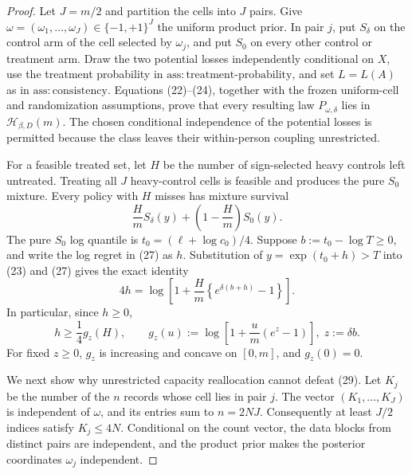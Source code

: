 \documentclass{article}
\begin{document}
\begin{proof}
Let \(J=m/2\) and partition the cells into \(J\) pairs.  Give
\(\omega=(\omega_1,\ldots,\omega_J)\in\{-1,+1\}^J\) the uniform product prior.  In pair \(j\), put \(S_\delta\) on the control arm of the cell selected by \(\omega_j\), and put \(S_0\) on every other control or treatment arm.  Draw the two potential losses independently conditional on \(X\), use the treatment probability in \(\mathrm{ass{:}treatment\text{-}probability}\), and set \(L=L(A)\) as in \(\mathrm{ass{:}consistency}\).  Equations (22)--(24), together with the frozen uniform-cell and randomization assumptions, prove that every resulting law \(P_{\omega,\delta}\) lies in \(\mathcal H_{\beta,D}(m)\).  The chosen conditional independence of the potential losses is permitted because the class leaves their within-person coupling unrestricted.

For a feasible treated set, let \(H\) be the number of sign-selected heavy controls left untreated.  Treating all \(J\) heavy-control cells is feasible and produces the pure \(S_0\) mixture.  Every policy with \(H\) misses has mixture survival
\[
\frac HmS_\delta(y)+\left(1-\frac Hm\right)S_0(y).                \tag{27}
\]
The pure \(S_0\) log quantile is \(t_0=(\ell+\log c_0)/4\).  Suppose
\(b:=t_0-\log T\geq0\), and write the log regret in (27) as \(h\).  Substitution of \(y=\exp(t_0+h)>T\) into (23) and (27) gives the exact identity
\[
4h=\log\left[1+\frac Hm\left\{e^{\delta(b+h)}-1\right\}\right]. \tag{28}
\]
In particular, since \(h\geq0\),
\[
h\geq\frac14 g_z(H),\qquad
g_z(u):=\log\left[1+\frac um(e^z-1)\right],\; z:=\delta b.     \tag{29}
\]
For fixed \(z\geq0\), \(g_z\) is increasing and concave on \([0,m]\), and \(g_z(0)=0\).

We next show why unrestricted capacity reallocation cannot defeat (29).  Let \(K_j\) be the number of the \(n\) records whose cell lies in pair \(j\).  The vector \((K_1,\ldots,K_J)\) is independent of \(\omega\), and its entries sum to \(n=2NJ\).  Consequently at least \(J/2\) indices satisfy \(K_j\leq4N\).  Conditional on the count vector, the data blocks from distinct pairs are independent, and the product prior makes the posterior coordinates \(\omega_j\) independent.


\end{proof}
\end{document}
